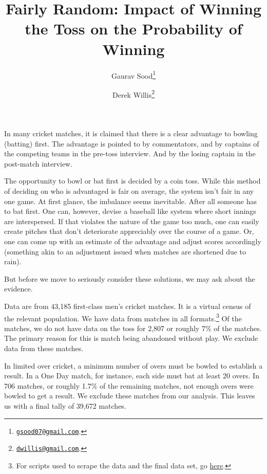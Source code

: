 \documentclass[11pt]{article}
\begin{document}
\title{\vspace{-2.0cm}\normalsize{\textbf{Fairly Random: Impact of Winning the Toss on the Probability of Winning}}}
\author{Gaurav Sood\thanks{\href{mailto:gsood07@gmail.com}{\texttt{gsood07@gmail.com}}.} \and Derek Willis\thanks{\href{mailto:dwillis@gmail.com}{\texttt{dwillis@gmail.com}}.}}
\maketitle
\doublespacing

In many cricket matches, it is claimed that there is a clear advantage to bowling (batting) first. The advantage is pointed to by commentators, and by captains of the competing teams in the pre-toss interview. And by the losing captain in the post-match interview.

The opportunity to bowl or bat first is decided by a coin toss. While this method of deciding on who is advantaged is fair on average, the system isn't fair in any one game. At first glance, the imbalance seems inevitable. After all someone has to bat first. One can, however, devise a baseball like system where short innings are interspersed. If that violates the nature of the game too much, one can easily create pitches that don't deteriorate appreciably over the course of a game. Or, one can come up with an estimate of the advantage and adjust scores accordingly (something akin to an adjustment issued when matches are shortened due to rain).

But before we move to seriously consider these solutions, we may ask about the evidence.

Data are from 43,185 first-class men's cricket matches. It is a virtual census of the relevant population. We have data from matches in all formats.\footnote{For scripts used to scrape the data and the final data set, go \href{http://github.com/soodoku/get-cricket-data/}{here}.} Of the matches, we do not have data on the toss for 2,807 or roughly 7\% of the matches. The primary reason for this is match being abandoned without play. We exclude data from these matches. 

In limited over cricket, a minimum number of overs must be bowled to establish a result. In a One Day match, for instance, each side must bat at least 20 overs. In 706 matches, or roughly 1.7\% of the remaining matches, not enough overs were bowled to get a result. We exclude these matches from our analysis. This leaves us with a final tally of 39,672 matches. 
\end{document}

